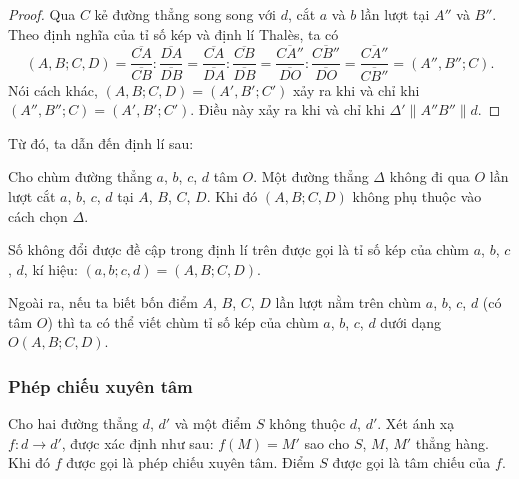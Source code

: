         \begin{proof}
            Qua \(C\) kẻ đường thẳng song song với \(d\), cắt \(a\) và \(b\) lần lượt tại \(A''\) và \(B''\). Theo định nghĩa của tỉ số kép và định lí Thalès, ta có
            \begin{equation}
                (A,B;C,D) = \frac{\overline{CA}}{\overline{CB}} : \frac{\overline{DA}}{\overline{DB}} = \frac{\overline{CA}}{\overline{DA}} : \frac{\overline{CB}}{\overline{DB}} = \frac{\overline{CA''}}{\overline{DO}} : \frac{\overline{CB''}}{\overline{DO}} = \frac{\overline{CA''}}{\overline{CB''}} = (A'',B'';C).
                \label{crossratio1}
            \end{equation}
            Nói cách khác, \((A,B;C,D) = (A',B';C')\) xảy ra khi và chỉ khi \((A'',B'';C) = (A',B';C')\). Điều này xảy ra khi và chỉ khi \(\Delta' \parallel A''B'' \parallel d\).
        \end{proof}

        Từ đó, ta dẫn đến định lí sau:

        \begin{theorem}
            Cho chùm đường thẳng \(a\), \(b\), \(c\), \(d\) tâm \(O\). Một đường thẳng \(\Delta\) không đi qua \(O\) lần lượt cắt \(a\), \(b\), \(c\), \(d\) tại \(A\), \(B\), \(C\), \(D\). Khi đó \((A,B;C,D)\) không phụ thuộc vào cách chọn \(\Delta\).
        \end{theorem}

        \begin{definition}
            Số không đổi được đề cập trong định lí trên được gọi là tỉ số kép của chùm \(a\), \(b\), \(c\), \(d\), kí hiệu: \((a,b;c,d) = (A,B;C,D)\).
        \end{definition}

        Ngoài ra, nếu ta biết bốn điểm \(A\), \(B\), \(C\), \(D\) lần lượt nằm trên chùm \(a\), \(b\), \(c\), \(d\) (có tâm \(O\)) thì ta có thể viết chùm tỉ số kép của chùm \(a\), \(b\), \(c\), \(d\) dưới dạng \(O(A,B;C,D)\).

    \subsubsection*{Phép chiếu xuyên tâm}

        \begin{definition}
            Cho hai đường thẳng \(d\), \(d'\) và một điểm \(S\) không thuộc \(d\), \(d'\). Xét ánh xạ \(f: d \to d'\), được xác định như sau: \(f(M) = M'\) sao cho \(S\), \(M\), \(M'\) thẳng hàng. Khi đó \(f\) được gọi là phép chiếu xuyên tâm. Điểm \(S\) được gọi là tâm chiếu của \(f\).
        \end{definition}

